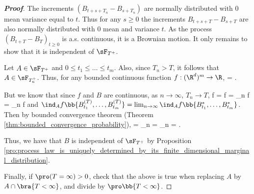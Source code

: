 \begin{proof}[\bf Proof]
The increments $(B_{t+s+T_n} - B_{s+T_n})$ are normally distributed with 0 mean variance equal to $t$. Thus for any $s \geq 0$ the increments $B_{t+s+T} - B_{s+T}$ are also normally distributed with 0 mean and variance $t$. As the process $(B_{t+T} - B_T)_{t \geq 0}$ is a.s. continuous, it is a Brownian motion. It only remains to show that it is independent of $\sF_{T^+}$.

Let $A \in \sF_{T^+}$ and $0\leq t_1\leq \dots \leq t_m$. Also, since $T_n > T$, it follows that $A \in \sF_{T_n^+}$. Thus, for any bounded continuous function $f : (\R^d)^m \to \R$,
\be
\E{} = \pro{} \E{}.
\ee

But we know that since $f$ and $B$ are continuous, as $n\to \infty$, $T_n \to T$,
\beast
f = f = \lim_{n\to \infty} f = \lim_{n\to \infty} f
\eeast
and $\ind_A f\bb{B^{(T)}_{t_1},\dots, B^{(T)}_{t_m}} = \lim_{n\to \infty} \ind_A f\bb{B^*_{t_1},\dots, B^*_{t_m}}$. Then by bounded convergence theorem (Theorem \ref{thm:bounded_convergence_probability}),
\beast
\E{} = \lim_{n\to \infty}\E{} = \pro{} \lim_{n\to \infty}  \E{} = \pro{} \E{}.
\eeast

Thus, we have that $B$ is independent of $\sF_{T^+}$ by Proposition \ref{pro:process_law_is_uniquely_determined_by_its_finite_dimensional_marginal_distribution}.%

Finally, if $\pro(T = \infty) > 0$, check that the above is true when replacing $A$ by $A \cap \bra{T < \infty}$, and divide by $\pro\bb{T < \infty}$.
\end{proof}


